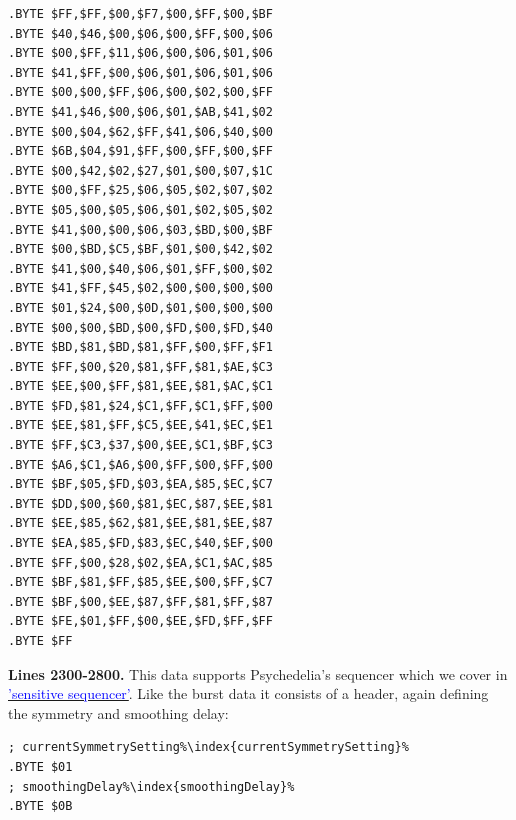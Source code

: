 \begin{minipage}[b]{0.33\linewidth}
\begin{lrbox}{\mybox}
\begin{lstlisting}[basicstyle=\ttfamily\tiny,escapechar=\%]
.BYTE $FF,$FF,$00,$F7,$00,$FF,$00,$BF
.BYTE $40,$46,$00,$06,$00,$FF,$00,$06
.BYTE $00,$FF,$11,$06,$00,$06,$01,$06
.BYTE $41,$FF,$00,$06,$01,$06,$01,$06
.BYTE $00,$00,$FF,$06,$00,$02,$00,$FF
.BYTE $41,$46,$00,$06,$01,$AB,$41,$02
.BYTE $00,$04,$62,$FF,$41,$06,$40,$00
.BYTE $6B,$04,$91,$FF,$00,$FF,$00,$FF
.BYTE $00,$42,$02,$27,$01,$00,$07,$1C
.BYTE $00,$FF,$25,$06,$05,$02,$07,$02
.BYTE $05,$00,$05,$06,$01,$02,$05,$02
.BYTE $41,$00,$00,$06,$03,$BD,$00,$BF
.BYTE $00,$BD,$C5,$BF,$01,$00,$42,$02
.BYTE $41,$00,$40,$06,$01,$FF,$00,$02
.BYTE $41,$FF,$45,$02,$00,$00,$00,$00
.BYTE $01,$24,$00,$0D,$01,$00,$00,$00
.BYTE $00,$00,$BD,$00,$FD,$00,$FD,$40
.BYTE $BD,$81,$BD,$81,$FF,$00,$FF,$F1
.BYTE $FF,$00,$20,$81,$FF,$81,$AE,$C3
.BYTE $EE,$00,$FF,$81,$EE,$81,$AC,$C1
.BYTE $FD,$81,$24,$C1,$FF,$C1,$FF,$00
.BYTE $EE,$81,$FF,$C5,$EE,$41,$EC,$E1
.BYTE $FF,$C3,$37,$00,$EE,$C1,$BF,$C3
.BYTE $A6,$C1,$A6,$00,$FF,$00,$FF,$00
.BYTE $BF,$05,$FD,$03,$EA,$85,$EC,$C7
.BYTE $DD,$00,$60,$81,$EC,$87,$EE,$81
.BYTE $EE,$85,$62,$81,$EE,$81,$EE,$87
.BYTE $EA,$85,$FD,$83,$EC,$40,$EF,$00
.BYTE $FF,$00,$28,$02,$EA,$C1,$AC,$85
.BYTE $BF,$81,$FF,$85,$EE,$00,$FF,$C7
.BYTE $BF,$00,$EE,$87,$FF,$81,$FF,$87
.BYTE $FE,$01,$FF,$00,$EE,$FD,$FF,$FF
.BYTE $FF

\end{lstlisting}
\end{lrbox}%
\scalebox{0.8}{\usebox{\mybox}}
\end{minipage}
\clearpage
{}
\textbf{Lines 2300-2800.} This data supports Psychedelia's sequencer which we cover in 
\hyperref[sec:sequencer]{\textcolor{blue}{'sensitive sequencer'}}.  Like the burst data it consists of a header, again defining the symmetry and smoothing delay:
\begin{lstlisting}[escapechar=\%]
; currentSymmetrySetting%\index{currentSymmetrySetting}%
.BYTE $01
; smoothingDelay%\index{smoothingDelay}%
.BYTE $0B
\end{lstlisting}

